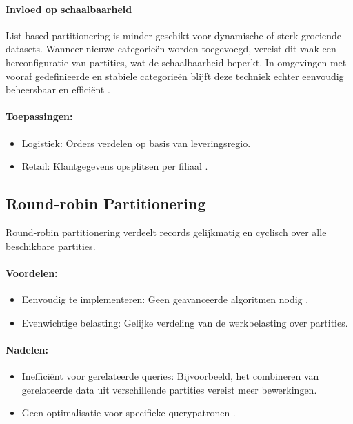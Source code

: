 \paragraph{Invloed op schaalbaarheid} 
List-based partitionering is minder geschikt voor dynamische of sterk groeiende datasets. Wanneer nieuwe categorieën worden toegevoegd, vereist dit vaak een herconfiguratie van partities, wat de schaalbaarheid beperkt. In omgevingen met vooraf gedefinieerde en stabiele categorieën blijft deze techniek echter eenvoudig beheersbaar en efficiënt \autocite{Mahmud2020}.
 
\paragraph{Toepassingen:}
\begin{itemize}
    \item Logistiek: Orders verdelen op basis van leveringsregio.
    \item Retail: Klantgegevens opsplitsen per filiaal \autocite{Ponnusamy2024}.
\end{itemize}
 
\subsection{Round-robin Partitionering}
Round-robin partitionering verdeelt records gelijkmatig en cyclisch over alle beschikbare partities.
 
\paragraph{Voordelen:}
\begin{itemize}
    \item Eenvoudig te implementeren: Geen geavanceerde algoritmen nodig \autocite{Mahmud2020}.
    \item Evenwichtige belasting: Gelijke verdeling van de werkbelasting over partities.
\end{itemize}
 
\paragraph{Nadelen:}
\begin{itemize}
    \item Inefficiënt voor gerelateerde queries: Bijvoorbeeld, het combineren van gerelateerde data uit verschillende partities vereist meer bewerkingen.
    \item Geen optimalisatie voor specifieke querypatronen \autocite{Ponnusamy2024}.
\end{itemize}
 
